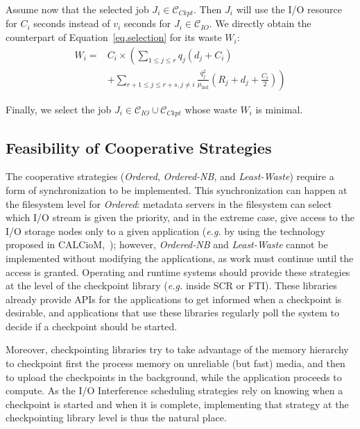 \documentclass[two]{article}
\newcommand{\eg}[0]{\emph{e.g.}\xspace}
\newcommand{\muind}{\mu_{\text{ind}}}
\newcommand{\ckpt}[1]{C_{#1}}
\newcommand{\reco}[1]{R_{#1}}
\newcommand{\wap}[1]{W_{#1}}
\newcommand{\Catiocat}{\mathcal{C}_{IO}\xspace}
\newcommand{\Catckptcat}{\mathcal{C}_{Ckpt}\xspace}
\newcommand{\fifoblock}{\emph{Ordered}\xspace}
\newcommand{\fifononblock}{\emph{Ordered-NB}\xspace}
\newcommand{\leastwaste}{\emph{Least-Waste}\xspace}
\begin{document}
Assume now that the selected job $J_{i} \in \Catckptcat$. Then $J_{i}$
will use the I/O resource for $\ckpt{i}$ seconds instead of $v_{i}$
seconds for $J_{i} \in \Catiocat$. We directly obtain the counterpart
of Equation~\eqref{eq.selection} for its waste $\wap{i}$:
 \begin{equation}
\label{eq.selection2}
 \begin{array}{ll}
 \wap{i} = & \ckpt{i} \times \left( \sum_{1 \leq j \leq r} q_{j} (d_{j} + \ckpt{i}) \right.\\
& + \left. \sum_{r+1 \leq j \leq r+s, j\neq i}   \frac{q^{2}_{j}}{\muind} (\reco{j} + d_{j} + \frac{C_{i}}{2}) \right)
 \end{array}
\end{equation}

Finally, we select the job $J_{i} \in \Catiocat \cup \Catckptcat$
whose waste $\wap{i}$ is minimal. 


\subsection{Feasibility of Cooperative Strategies}
\label{sec:feasibility}

The cooperative strategies (\fifoblock, \fifononblock, and
\leastwaste) require a form of synchronization to be implemented. This
synchronization can happen at the filesystem level for \fifoblock:
metadata servers in the filesystem can select which I/O stream is
given the priority, and in the extreme case, give access to the I/O
storage nodes only to a given application (\eg by using the technology
proposed in CALCioM,~\cite{Dorier2015}); however, \fifononblock and
\leastwaste cannot be implemented without modifying the applications,
as work must continue until the access is granted.
Operating and runtime systems should provide these strategies at the level 
of the checkpoint library (\eg inside SCR or FTI). These libraries already provide APIs for the
applications to get informed when a checkpoint is desirable, and
applications that use these libraries regularly poll the system to
decide if a checkpoint should be started.

Moreover, checkpointing libraries try to take advantage of the memory
hierarchy to checkpoint first the process memory on unreliable (but
fast) media, and then to upload the checkpoints in the background,
while the application proceeds to compute. As the I/O Interference
scheduling strategies rely on knowing when a checkpoint is started and
when it is complete, implementing that strategy at the checkpointing
library level is thus the natural place.
\end{document}
